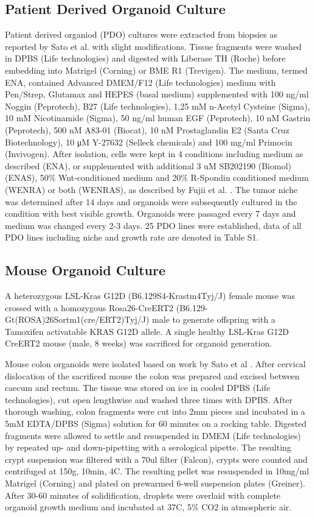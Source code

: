 \begin{flushleft}
\subsection{Patient Derived Organoid Culture}
Patient derived organiod (PDO) cultures were extracted from biopsies as reported by Sato et al. \cite{Sato2011} with slight modifications. Tissue fragments were washed in DPBS (Life technologies) and digested with Liberase TH (Roche) before embedding into Matrigel (Corning) or BME R1 (Trevigen). The medium, termed ENA, contained Advanced DMEM/F12 (Life technologies) medium with Pen/Strep, Glutamax and HEPES (basal medium) supplemented with 100 ng/ml Noggin (Peprotech), B27 (Life technologies), 1,25 mM n-Acetyl Cysteine (Sigma), 10 mM Nicotinamide (Sigma), 50 ng/ml human EGF (Peprotech), 10 nM Gastrin (Peprotech), 500 nM A83-01 (Biocat), 10 nM Prostaglandin E2 (Santa Cruz Biotechnology), 10 μM Y-27632 (Selleck chemicals) and 100 mg/ml Primocin (Invivogen). After isolation, cells were kept in 4 conditions including medium as described (ENA), or supplemented with additional 3 uM SB202190 (Biomol) (ENAS), 50\% Wnt-conditioned medium and 20\% R-Spondin conditioned medium (WENRA) or both (WENRAS), as described by Fujii et al. \cite{Fujii2016ATumorigenesi  }. 
The tumor niche was determined after 14 days and organoids were subsequently cultured in the condition with best visible growth. 
Organoids were passaged every 7 days and medium was changed every 2-3 days. 25 PDO lines were established, data of all PDO lines including niche and growth rate are denoted in Table S1.

\subsection{Mouse Organoid Culture}
A heterozygous LSL-Kras G12D (B6.129S4-Krastm4Tyj/J) female mouse was crossed with a homozygous Rosa26-CreERT2 (B6.129-Gt(ROSA)26Sortm1(cre/ERT2)Tyj/J) male to generate offspring with a Tamoxifen activatable KRAS G12D allele. A single healthy LSL-Kras G12D CreERT2 mouse (male, 8 weeks) was sacrificed for organoid generation. 

Mouse colon organoids were isolated based on work by Sato et al \cite{Sato2009}. After cervical dislocation of the sacrificed mouse the colon was prepared and excised between caecum and rectum. The tissue was stored on ice in cooled DPBS (Life technologies), cut open lengthwise and washed three times with DPBS. After thorough washing, colon fragments were cut into 2mm pieces and incubated in a 5mM EDTA/DPBS (Sigma) solution for 60 minutes on a rocking table. Digested fragments were allowed to settle and resuspended in DMEM (Life technologies) by repeated up- and down-pipetting with a serological pipette. The resulting crypt suspension was filtered with a 70ul filter (Falcon), crypts were counted and centrifuged at 150g, 10min, 4C. The resulting pellet was resuspended in 10mg/ml Matrigel (Corning) and plated on prewarmed 6-well suspension plates (Greiner). After 30-60 minutes of solidification, droplets were overlaid with complete organoid growth medium and incubated at 37C, 5\% CO2 in atmospheric air.


\end{flushleft}

